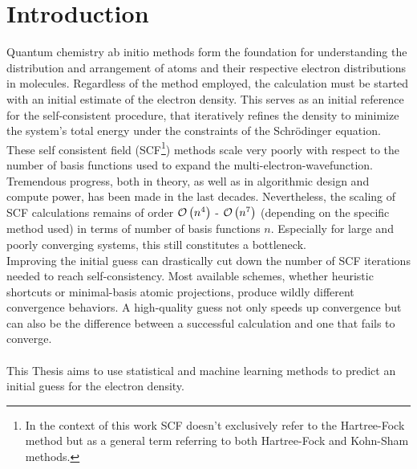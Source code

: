 \chapter{Introduction}
\label{sec:introduction}

Quantum chemistry ab initio methods form the foundation for understanding the distribution and arrangement of atoms and their respective electron distributions in molecules. Regardless of the method employed, the calculation must be started with an initial estimate of the electron density. This serves as an initial reference for the self-consistent procedure, that iteratively refines the density to minimize the system's total energy under the constraints of the Schrödinger equation. These self consistent field (SCF\footnote{In the context of this work SCF doesn't exclusively refer to the Hartree-Fock method but as a general term referring to both Hartree-Fock and Kohn-Sham methods.}) methods scale very poorly with respect to the number of basis functions used to expand the multi-electron-wavefunction. Tremendous progress, both in theory, as well as in algorithmic design and compute power, has been made in the last decades. Nevertheless, the scaling of SCF calculations remains of order $\mathcal{O}\left(n^4\right)$ - $\mathcal{O}\left(n^7\right)$ (depending on the specific method used) in terms of number of basis functions $n$. Especially for large and poorly converging systems, this still constitutes a bottleneck. \\

Improving the initial guess can drastically cut down the number of SCF iterations needed to reach self-consistency. Most available schemes, whether heuristic shortcuts or minimal-basis atomic projections, produce wildly different convergence behaviors. A high-quality guess not only speeds up convergence but can also be the difference between a successful calculation and one that fails to converge.
 \\
\\
This Thesis aims to use statistical and machine learning methods to predict an initial guess for the electron density. 


